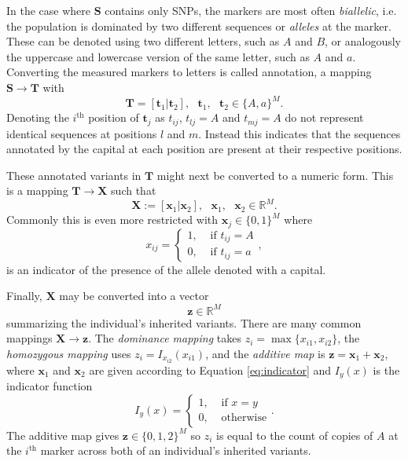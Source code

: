 \documentclass[sts]{imsart}
\newcommand{\ve}[1]{\mathbf{#1}}           %
\newcommand{\m}[1]{\mathbf{#1}}               %
\newcommand{\ind}[2]{I_{#2} \left( #1 \right)}
\newcommand{\field}[1]{\mathbb{#1}}
\newcommand{\Reals}{\field{R}}
\begin{document}
In the case where $\m{S}$ contains only SNPs, the markers are most often \textit{biallelic}, i.e. the population is dominated by two different sequences or \textit{alleles} at the marker. These can be denoted using two different letters, such as $A$ and $B$, or analogously the uppercase and lowercase version of the same letter, such as $A$ and $a$. Converting the measured markers to letters is called annotation, a mapping $\m{S} \rightarrow \m{T}$ with
$$\m{T} = [\ve{t}_1 | \ve{t}_2], \text{ } \ve{t}_1, \text{ } \ve{t}_2 \in \{A,a\}^M.$$
Denoting the $i^{\text{th}}$ position of $\ve{t}_j$ as $t_{ij}$, $t_{lj} = A$ and $t_{mj} = A$ do not represent identical sequences at positions $l$ and $m$. Instead this indicates that the sequences annotated by the capital at each position are present at their respective positions.

These annotated variants in $\m{T}$ might next be converted to a numeric form. This is a mapping $\m{T} \rightarrow \m{X}$ such that
$$\m{X} := [\ve{x}_1 | \ve{x}_2], \text{ } \ve{x}_1, \text{ } \ve{x}_2 \in \Reals^M.$$
Commonly this is even more restricted with $\ve{x}_j \in \{0,1\}^M$ where
\begin{equation} \label{eq:indicator}
x_{ij} = \begin{cases}
  1, & \text{ if } t_{ij} = A \\
  0, & \text{ if } t_{ij} = a
\end{cases},
\end{equation}
is an indicator of the presence of the allele denoted with a capital.

Finally, $\m{X}$ may be converted into a vector
$$\ve{z} \in \Reals^M$$
summarizing the individual's inherited variants. There are many common mappings $\m{X} \rightarrow \ve{z}$. The \textit{dominance mapping} takes $z_i = \max\{x_{i1}, x_{i2}\}$, the \textit{homozygous mapping} uses $z_i = \ind{x_{i1}}{x_{i2}}$, and the \textit{additive map} is $\ve{z} = \ve{x}_1 + \ve{x}_2$, where $\ve{x}_1$ and $\ve{x}_2$ are given according to Equation \ref{eq:indicator} and $\ind{x}{y}$ is the indicator function
\begin{equation*}\ind{x}{y} = \begin{cases}
  1, & \text{ if } x = y \\
  0, & \text{ otherwise}
\end{cases}.\end{equation*} The additive map gives $\ve{z} \in \{0,1,2\}^M$ so $z_i$ is equal to the count of copies of $A$ at the $i^{\text{th}}$ marker across both of an individual's inherited variants.
\end{document}
